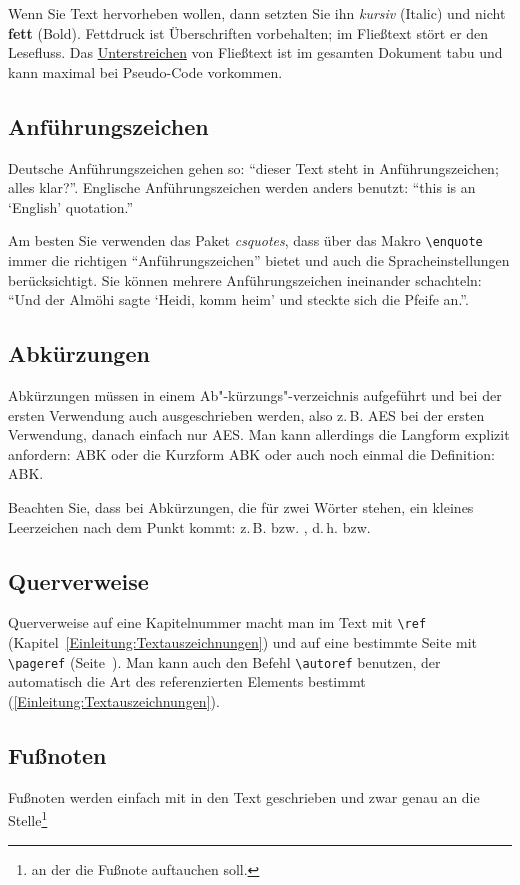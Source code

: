 \documentclass[conference,compsoc,final,a4paper]{IEEEtran}
\begin{document}
Wenn Sie Text hervorheben wollen, dann setzten Sie ihn \textit{kursiv} (Italic) und nicht \textbf{fett} (Bold). Fettdruck ist Überschriften vorbehalten; im Fließtext stört er den Lesefluss. Das \underline{Unterstreichen} von Fließtext ist im gesamten Dokument tabu und kann maximal bei Pseudo-Code vorkommen.

\subsection{Anführungszeichen}
Deutsche Anführungszeichen gehen so: "`dieser Text steht in \glq Anführungszeichen\grq; alles klar?"'. Englische Anführungszeichen werden anders benutzt: ``this is an `English' quotation.''

Am besten Sie verwenden das Paket \textit{csquotes}, dass über das Makro \lstinline+\enquote+ immer die richtigen \enquote{Anführungszeichen} bietet und auch die Spracheinstellungen berücksichtigt. Sie können mehrere Anführungszeichen ineinander schachteln: \enquote{Und der Almöhi sagte \enquote{Heidi, komm heim} und steckte sich die Pfeife an.}. 

\subsection{Abkürzungen}
Abkürzungen müssen in einem Ab"-kürzungs"-verzeichnis aufgeführt und bei der ersten Verwendung auch ausgeschrieben werden, also z.\,B. \ac{AES} bei der ersten Verwendung, danach einfach nur \ac{AES}. Man kann allerdings die Langform explizit anfordern: \acl{ABK} oder die Kurzform \acs{ABK} oder auch noch einmal die Definition: \acf{ABK}.

Beachten Sie, dass bei Abkürzungen, die für zwei Wörter stehen, ein kleines Leerzeichen nach dem Punkt kommt: z.\,B. bzw. \zb, d.\,h. bzw. \dahe

\subsection{Querverweise}
Querverweise auf eine Kapitelnummer macht man im Text mit \lstinline+\ref+ (Kapitel~\ref{Einleitung:Textauszeichnungen}) und auf eine bestimmte Seite mit \lstinline+\pageref+ (Seite~\pageref{Einleitung:Textauszeichnungen}). Man kann auch den Befehl \lstinline+\autoref+ benutzen, der automatisch die Art des referenzierten Elements bestimmt (\zb \autoref{Einleitung:Textauszeichnungen}).

\subsection{Fußnoten}
Fußnoten werden einfach mit in den Text geschrieben und zwar genau an die Stelle\footnote{an der die Fußnote auftauchen soll.}
\end{document}
